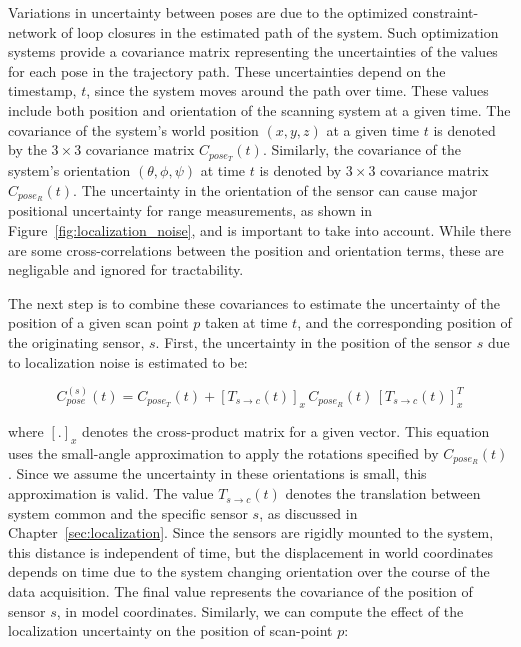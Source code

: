 \documentclass[12pt,onecolumn,oneside]{book}
\begin{document}
Variations in uncertainty between poses are due to the optimized constraint-network of loop closures in the estimated path of the system.  Such optimization systems provide a covariance matrix representing the uncertainties of the values for each pose in the trajectory path.  These uncertainties depend on the timestamp, $t$, since the system moves around the path over time.  These values include both position and orientation of the scanning system at a given time.  The covariance of the system's world position $(x,y,z)$ at a given time $t$ is denoted by the $3 \times 3$ covariance matrix $C_{pose_T}(t)$.  Similarly, the covariance of the system's orientation $(\theta,\phi,\psi)$ at time $t$ is denoted by $3 \times 3$ covariance matrix $C_{pose_R}(t)$.  The uncertainty in the orientation of the sensor can cause major positional uncertainty for range measurements, as shown in Figure~\ref{fig:localization_noise}, and is important to take into account.  While there are some cross-correlations between the position and orientation terms, these are negligable and ignored for tractability.  

The next step is to combine these covariances to estimate the uncertainty of the position of a given scan point $p$ taken at time $t$, and the corresponding position of the originating sensor, $s$.  First, the uncertainty in the position of the sensor $s$ due to localization noise is estimated to be:

\begin{equation}
C^{(s)}_{pose}(t) = C_{pose_T}(t) + \left[ T_{s\rightarrow c}(t) \right]_x \, C_{pose_R}(t) \, \left[ T_{s\rightarrow c}(t) \right]_x^T
\end{equation}

where $\left[.\right]_x$ denotes the cross-product matrix for a given vector.  This equation uses the small-angle approximation to apply the rotations specified by $C_{pose_R}(t)$.  Since we assume the uncertainty in these orientations is small, this approximation is valid.  The value $T_{s\rightarrow c}(t)$ denotes the translation between system common and the specific sensor $s$, as discussed in Chapter~\ref{sec:localization}.  Since the sensors are rigidly mounted to the system, this distance is independent of time, but the displacement in world coordinates depends on time due to the system changing orientation over the course of the data acquisition.  The final value represents the covariance of the position of sensor $s$, in model coordinates.  Similarly, we can compute the effect of the localization  uncertainty on the position of scan-point $p$:
\end{document}
